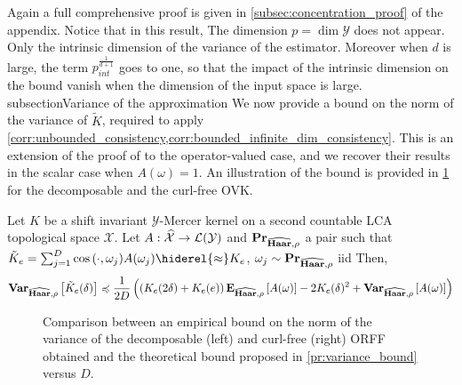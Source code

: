 \documentclass[twoside,11pt]{article}
\begin{document}
Again a full comprehensive proof is given in \cref{subsec:concentration_proof}
of the appendix. Notice that in this result, The dimension
$p=\dim{\mathcal{Y}}$ does not appear. Only the intrinsic dimension of the
variance of the estimator. Moreover when $d$ is large, the term
$p_{int}^{\frac{1}{d + 1}}$ goes to one, so that the impact of the intrinsic
dimension on the bound vanish when the dimension of the input space is large.
subsection{Variance of the  approximation}
We now provide a bound on the norm of the variance of $\tilde{K}$, required to
apply \cref{corr:unbounded_consistency,corr:bounded_infinite_dim_consistency}.
This is an extension of the proof of \citet{sutherland2015} to the
operator-valued case, and we recover their results in the scalar case when
$A(\omega)=1$. An illustration of the bound is provided in
\cref{fig:approximation_error_var} for the decomposable and the curl-free
\acs{OVK}.
\begin{proposition}
    \label{pr:variance_bound}
    Let $K$ be a shift invariant $\mathcal{Y}$-Mercer kernel on a second
    countable \ac{LCA} topological space $\mathcal{X}$. Let
    $A:\widehat{\mathcal{X}}\to\mathcal{L}(\mathcal{Y})$ and
    ${\mathbf{{Pr}}}_{\widehat{\mathbf{Haar}},\rho}$ a pair such that $\tilde{K}_e =
    \sum_{j=1}^D \cos{\pairing{\cdot,\omega_j}}A (\omega_j) \hiderel{\approx}
    K_e$, $\omega_j\sim{\mathbf{{Pr}}}_{\widehat{\mathbf{Haar}}, \rho}$ \acs{iid} Then,
    \begin{dmath*}
        \variance_{\dual{\Haar}, \rho} \left[ \tilde{K}_e(\delta) \right]
        \preccurlyeq \frac{1}{2D} \left( \left( K_e(2\delta) + K_e(e) \right)
        \expectation_{\dual{\Haar}, \rho}\left[ A(\omega) \right] -
        2 K_e(\delta)^2 + \variance_{\dual{\Haar}, \rho}\left[
        A(\omega) \right]\right)
    \end{dmath*}
\end{proposition}
\begin{figure}[t]
    \begin{minipage}[c]{.46\linewidth}
        \centering\resizebox{\linewidth}{!}{%
        }
    \end{minipage}
    \begin{minipage}[c]{.54\linewidth}
        \centering\resizebox{\linewidth}{!}{%
        }
    \end{minipage}
    \caption[ORFF variance bound]{Comparison between an empirical bound on the
    norm of the variance of the decomposable (left) and  curl-free (right) ORFF
    obtained and the theoretical bound proposed in \cref{pr:variance_bound}
    versus $D$. \label{fig:approximation_error_var}}
\end{figure}
\end{document}
